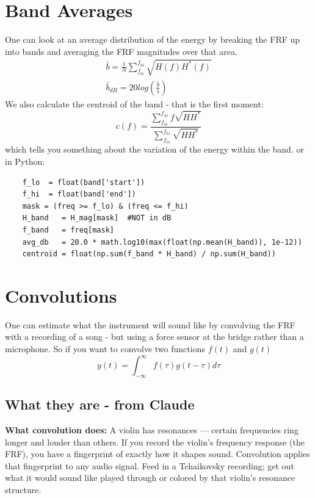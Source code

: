 \documentclass[11pt, oneside]{article}   	%
\begin{document}
\section{Band Averages}
One can look at an average distribution of the energy by breaking the FRF up into bands and averaging the FRF magnitudes over that area.
\begin{equation}
    \begin{split}
        \bar b = \frac{1}{N}\sum_{f_{lo}}^{f_{hi}} \sqrt{H(f)H^*(f)} \\
        \bar b_{dB} = 20 log(\frac{\bar b}{1})
    \end{split}
\end{equation}
We also calculate the centroid of the band - that is the first moment:
\begin{equation}
c(f) = \frac{\sum_{f_{lo}}^{f_{hi}} f\sqrt{HH^*}}{\sum_{f_{lo}}^{f_{hi}} \sqrt{HH^*}}
\end{equation}
which tells you something about the variation of the energy within the band.
or in Python:
\begin{verbatim}
    f_lo  = float(band['start'])
    f_hi  = float(band['end'])
    mask = (freq >= f_lo) & (freq <= f_hi)
    H_band   = H_mag[mask]  #NOT in dB
    f_band   = freq[mask]
    avg_db   = 20.0 * math.log10(max(float(np.mean(H_band)), 1e-12))
    centroid = float(np.sum(f_band * H_band) / np.sum(H_band))
\end{verbatim}

\section{Convolutions}
One can estimate what the instrument will sound like by convolving the FRF with a recording of a song - but using a force sensor at the bridge rather than a microphone.  So if you want to convolve two functions $f(t)$ and $g(t)$
\begin{equation}
    y(t) = \int_{-\infty}^\infty f(\tau)g(t-\tau)d\tau
\end{equation}

\subsection{What they are - from Claude}

\textbf{What convolution does: }
A violin has resonances — certain frequencies ring longer and louder than others. If you record the violin's frequency response (the FRF), you have a fingerprint of exactly how it shapes sound.
Convolution applies that fingerprint to any audio signal. Feed in a Tchaikovsky recording; get out what it would sound like played through or colored by that violin's resonance structure.
\end{document}
